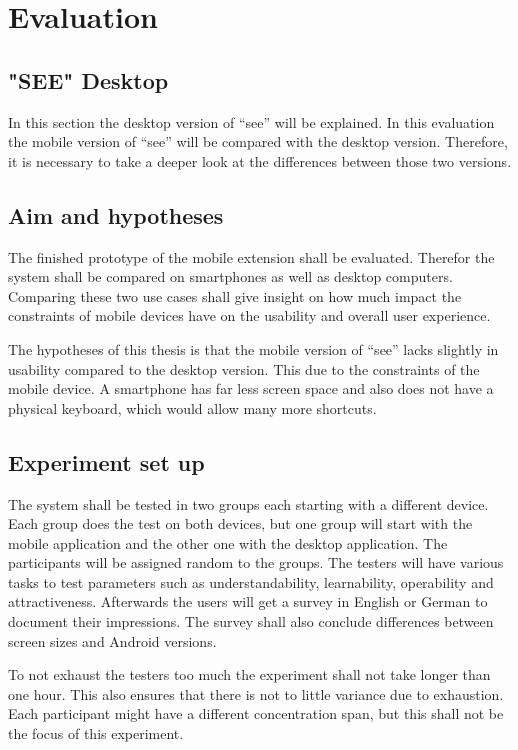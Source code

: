 \section{Evaluation}

\subsection{"SEE" Desktop}
In this section the desktop version of \enquote{\gls{see}} will be explained. 
In this evaluation the mobile version of \enquote{\gls{see}} will be compared with the desktop version.
Therefore, it is necessary to take a deeper look at the differences between those two versions.

\subsection{Aim and hypotheses}
The finished prototype of the mobile extension shall be evaluated. 
Therefor the system shall be compared on smartphones as well as desktop computers. 
Comparing these two use cases shall give insight on how much impact the constraints of mobile devices have on the usability and overall user experience.

The hypotheses of this thesis is that the mobile version of \enquote{\gls{see}} lacks slightly in usability compared to the desktop version.
This due to the constraints of the mobile device. 
A smartphone has far less screen space and also does not have a physical keyboard, which would allow many more shortcuts.
\subsection{Experiment set up}
The system shall be tested in two groups each starting with a different device. 
Each group does the test on both devices, but one group will start with the mobile application and the other one with the desktop application.
The participants will be assigned random to the groups.
The testers will have various tasks to test parameters such as understandability, learnability, operability and attractiveness. 
Afterwards the users will get a survey in English or German to document their impressions.
The survey shall also conclude differences between screen sizes and Android versions. 

To not exhaust the testers too much the experiment shall not take longer than one hour. 
This also ensures that there is not to little variance due to exhaustion.
Each participant might have a different concentration span, but this shall not be the focus of this experiment. 


